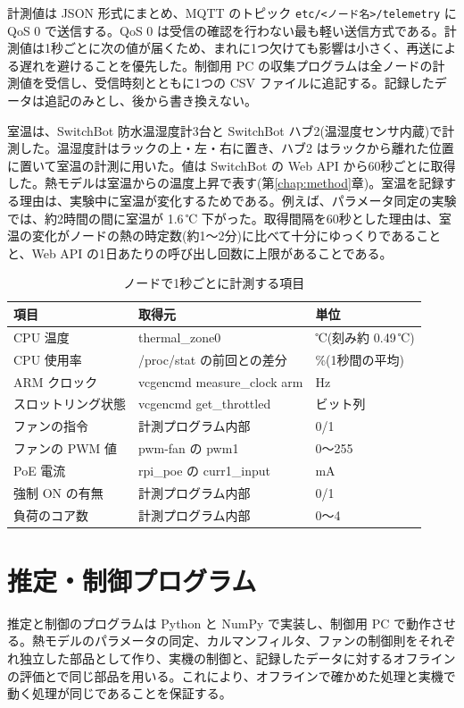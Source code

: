 計測値は JSON 形式にまとめ、MQTT のトピック \texttt{etc/<ノード名>/telemetry} に QoS 0 で送信する。QoS 0 は受信の確認を行わない最も軽い送信方式である。計測値は1秒ごとに次の値が届くため、まれに1つ欠けても影響は小さく、再送による遅れを避けることを優先した。制御用 PC の収集プログラムは全ノードの計測値を受信し、受信時刻とともに1つの CSV ファイルに追記する。記録したデータは追記のみとし、後から書き換えない。

室温は、SwitchBot 防水温湿度計3台と SwitchBot ハブ2(温湿度センサ内蔵)で計測した。温湿度計はラックの上・左・右に置き、ハブ2 はラックから離れた位置に置いて室温の計測に用いた。値は SwitchBot の Web API から60秒ごとに取得した。熱モデルは室温からの温度上昇で表す(第\ref{chap:method}章)。室温を記録する理由は、実験中に室温が変化するためである。例えば、パラメータ同定の実験では、約2時間の間に室温が 1.6\,℃ 下がった。取得間隔を60秒とした理由は、室温の変化がノードの熱の時定数(約1〜2分)に比べて十分にゆっくりであることと、Web API の1日あたりの呼び出し回数に上限があることである。

\begin{table}[tb]
  \centering
  \caption{ノードで1秒ごとに計測する項目}
  \label{tab:telemetry}
  \begin{tabular}{lll}
    \toprule
    項目 & 取得元 & 単位 \\
    \midrule
    CPU 温度 & thermal\_zone0 & ℃(刻み約 0.49\,℃) \\
    CPU 使用率 & /proc/stat の前回との差分 & \%(1秒間の平均) \\
    ARM クロック & vcgencmd measure\_clock arm & Hz \\
    スロットリング状態 & vcgencmd get\_throttled & ビット列 \\
    ファンの指令 & 計測プログラム内部 & 0/1 \\
    ファンの PWM 値 & pwm-fan の pwm1 & 0〜255 \\
    PoE 電流 & rpi\_poe の curr1\_input & mA \\
    強制 ON の有無 & 計測プログラム内部 & 0/1 \\
    負荷のコア数 & 計測プログラム内部 & 0〜4 \\
    \bottomrule
  \end{tabular}
\end{table}


\section{推定・制御プログラム}\label{sec:impl-control}
推定と制御のプログラムは Python と NumPy で実装し、制御用 PC で動作させる。熱モデルのパラメータの同定、カルマンフィルタ、ファンの制御則をそれぞれ独立した部品として作り、実機の制御と、記録したデータに対するオフラインの評価とで同じ部品を用いる。これにより、オフラインで確かめた処理と実機で動く処理が同じであることを保証する。

